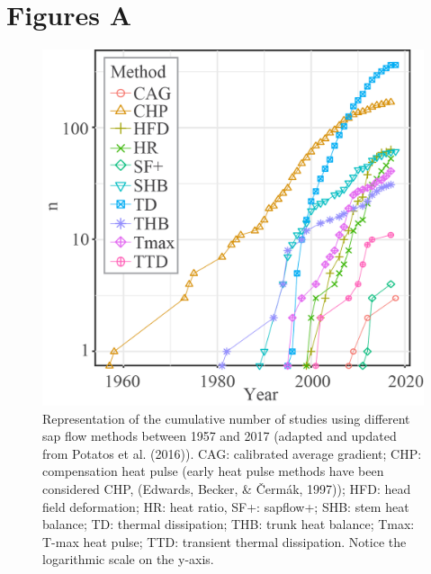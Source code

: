 \documentclass[11pt,twoside]{reedthesis}
\begin{document}
\section{Figures A}\label{figures-a}

\setlength{\abovecaptionskip}{0pt}











\setlength{\abovecaptionskip}{15pt}
\begin{figure}[hbt!]

{\centering \includegraphics[width=0.8\linewidth]{figure/appendixA/fig1} 

}

\caption[Representation of the cumulative number of studies using different sap flow methods between 1957 and 2017]{Representation of the cumulative number of studies using
different sap flow methods between 1957 and 2017 (adapted and updated
from Potatos et al. (2016)). CAG: calibrated average gradient; CHP:
compensation heat pulse (early heat pulse methods have been considered
CHP, (Edwards, Becker, \& Čermák, 1997)); HFD: head field deformation;
HR: heat ratio, SF+: sapflow+; SHB: stem heat balance; TD: thermal
dissipation; THB: trunk heat balance; Tmax: T-max heat pulse; TTD:
transient thermal dissipation. Notice the logarithmic scale on the
y-axis.}\label{fig:apa11}
\end{figure}
\setlength{\abovecaptionskip}{0pt} \newpage
\end{document}
